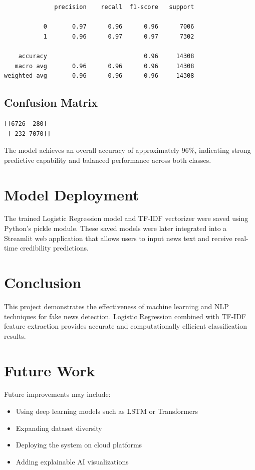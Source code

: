 \documentclass[12pt]{article}
\begin{document}
\begin{verbatim}
              precision    recall  f1-score   support

           0       0.97      0.96      0.96      7006
           1       0.96      0.97      0.97      7302

    accuracy                           0.96     14308
   macro avg       0.96      0.96      0.96     14308
weighted avg       0.96      0.96      0.96     14308
\end{verbatim}

\subsection{Confusion Matrix}

\begin{verbatim}
[[6726  280]
 [ 232 7070]]
\end{verbatim}

The model achieves an overall accuracy of approximately 96\%, indicating
strong predictive capability and balanced performance across both classes.

\section{Model Deployment}

The trained Logistic Regression model and TF-IDF vectorizer were saved
using Python's pickle module. These saved models were later integrated
into a Streamlit web application that allows users to input news text
and receive real-time credibility predictions.

\section{Conclusion}

This project demonstrates the effectiveness of machine learning and
NLP techniques for fake news detection. Logistic Regression combined
with TF-IDF feature extraction provides accurate and computationally
efficient classification results.

\section{Future Work}

Future improvements may include:

\begin{itemize}
\item Using deep learning models such as LSTM or Transformers
\item Expanding dataset diversity
\item Deploying the system on cloud platforms
\item Adding explainable AI visualizations
\end{itemize}
\end{document}
